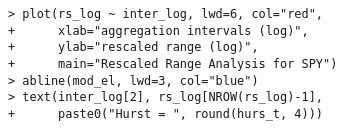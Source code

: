 \documentclass[10pt]{beamer}\usepackage[]{graphicx}\usepackage[]{color}
\makeatletter
\newenvironment{kframe}{%
 \def\at@end@of@kframe{}%
 \ifinner\ifhmode%
  \def\at@end@of@kframe{\end{minipage}}%
  \begin{minipage}{\columnwidth}%
 \fi\fi%
 \def\FrameCommand##1{\hskip\@totalleftmargin \hskip-\fboxsep
 \colorbox{shadecolor}{##1}\hskip-\fboxsep
     \hskip-\linewidth \hskip-\@totalleftmargin \hskip\columnwidth}%
 \MakeFramed {\advance\hsize-\width
   \@totalleftmargin\z@ \linewidth\hsize
   \@setminipage}}%
 {\par\unskip\endMakeFramed%
 \at@end@of@kframe}
\newenvironment{knitrout}{}{} %
\makeatother
\begin{document}
\begin{frame}[fragile,t]{\subsecname}
\begin{block}{}
\begin{columns}[T]
\begin{knitrout}
\color{fgcolor}\begin{kframe}
\begin{verbatim}
> plot(rs_log ~ inter_log, lwd=6, col="red",
+      xlab="aggregation intervals (log)",
+      ylab="rescaled range (log)",
+      main="Rescaled Range Analysis for SPY")
> abline(mod_el, lwd=3, col="blue")
> text(inter_log[2], rs_log[NROW(rs_log)-1], 
+      paste0("Hurst = ", round(hurs_t, 4)))
\end{verbatim}
\end{kframe}
\end{knitrout}
  \end{columns}
\end{block}

\end{frame}


\end{document}
